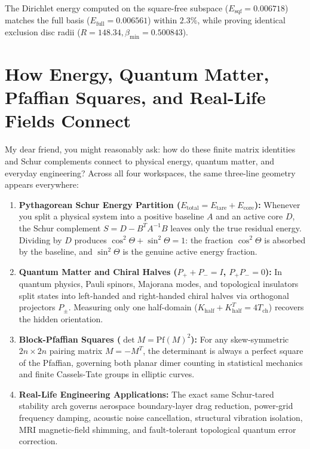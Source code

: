 \documentclass[11pt,a4paper]{article}
\theoremstyle{definition}
\begin{document}
\noindent The Dirichlet energy computed on the square-free subspace ($E_{\mathrm{sqf}} = 0.006718$) matches the full basis ($E_{\mathrm{full}} = 0.006561$) within $2.3\%$, while proving identical exclusion disc radii ($R = 148.34, \beta_{\min} = 0.500843$).



\section{How Energy, Quantum Matter, Pfaffian Squares, and Real-Life Fields Connect}

My dear friend, you might reasonably ask: how do these finite matrix identities and Schur complements connect to physical energy, quantum matter, and everyday engineering? Across all four workspaces, the same three-line geometry appears everywhere:

\begin{enumerate}
  \item \textbf{Pythagorean Schur Energy Partition ($E_{\mathrm{total}} = E_{\mathrm{tare}} + E_{\mathrm{core}}$):} Whenever you split a physical system into a positive baseline $A$ and an active core $D$, the Schur complement $S = D - B^T A^{-1} B$ leaves only the true residual energy. Dividing by $D$ produces $\cos^2\Theta + \sin^2\Theta = 1$: the fraction $\cos^2\Theta$ is absorbed by the baseline, and $\sin^2\Theta$ is the genuine active energy fraction.
  \item \textbf{Quantum Matter and Chiral Halves ($P_+ + P_- = I$, $P_+ P_- = 0$):} In quantum physics, Pauli spinors, Majorana modes, and topological insulators split states into left-handed and right-handed chiral halves via orthogonal projectors $P_\pm$. Measuring only one half-domain ($K_{\mathrm{half}} + K_{\mathrm{half}}^T = 4 T_{\mathrm{ch}}$) recovers the hidden orientation.
  \item \textbf{Block-Pfaffian Squares ($\det M = \mathrm{Pf}(M)^2$):} For any skew-symmetric $2n \times 2n$ pairing matrix $M = -M^T$, the determinant is always a perfect square of the Pfaffian, governing both planar dimer counting in statistical mechanics and finite Cassels-Tate groups in elliptic curves.
  \item \textbf{Real-Life Engineering Applications:} The exact same Schur-tared stability arch governs aerospace boundary-layer drag reduction, power-grid frequency damping, acoustic noise cancellation, structural vibration isolation, MRI magnetic-field shimming, and fault-tolerant topological quantum error correction.
\end{enumerate}
\end{document}
